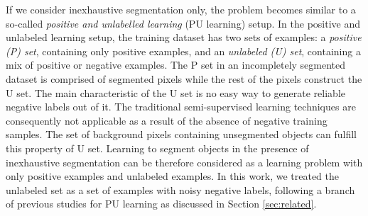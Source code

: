 

If we consider inexhaustive segmentation only, the problem becomes similar to a so-called \textit{positive and unlabelled learning} (PU learning) setup\cite{li2005learning}.
In the positive and unlabeled learning setup, the training dataset has two sets of examples: a \textit{positive (P) set}, containing only positive examples, and an \textit{unlabeled (U) set}, containing a mix of positive or negative examples.
The P set in an incompletely segmented dataset is comprised of segmented pixels while the rest of the pixels construct the U set.
The main characteristic of the U set is no easy way to generate reliable negative labels out of it.
The traditional semi-supervised learning techniques are consequently not applicable as a result of the absence of negative training samples.
The set of background pixels containing unsegmented objects can fulfill this property of U set.
Learning to segment objects in the presence of inexhaustive segmentation can be therefore considered as a learning problem with only positive examples and unlabeled examples.
In this work, we treated the unlabeled set as a set of examples with noisy negative labels, following a branch of previous studies for PU learning as discussed in Section \ref{sec:related}.



